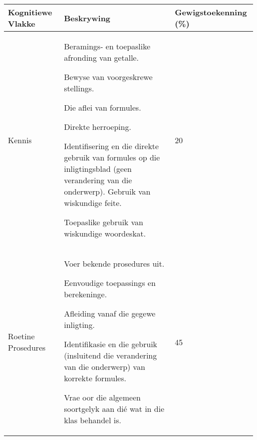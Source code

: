 \begin{table}[H]
\begin{center}
\begin{tabular} {|p{3cm}|p{6cm}|p{2.5cm}|} \hline
\textbf{Kognitiewe Vlakke} & \textbf{Beskrywing} & \textbf{Gewigstoekenning (\%)} \\ \hline
Kennis & 
Beramings- en toepaslike afronding van getalle. \par 
Bewyse van voorgeskrewe stellings. \par 
Die aflei van formules. \par 
Direkte herroeping. \par 
Identifisering en die direkte gebruik van formules op die
inligtingsblad (geen verandering van die onderwerp). Gebruik van
wiskundige feite. \par
Toepaslike gebruik van wiskundige woordeskat.
& 
20 \\ \hline

Roetine Prosedures & 
Voer bekende prosedures uit. \par 
Eenvoudige toepassings en berekeninge. \par 
Afleiding vanaf die gegewe inligting. \par 
Identifikasie en die gebruik (insluitend die verandering van die onderwerp) van korrekte formules. \par 
Vrae oor die algemeen soortgelyk aan di\'{e} wat in die klas behandel is.
&
45 \\ \hline


\end{tabular}
\end{center}
\end{table}
